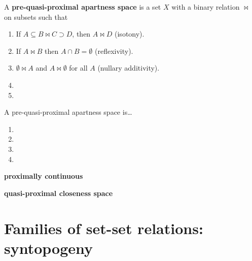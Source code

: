 \documentclass{article}
\def\Rp{[0,\infty]}
\begin{document}
\begin{defn}
  A \textbf{pre-quasi-proximal apartness space} is a set $X$ with a binary relation $\bowtie$ on subsets such that
  \begin{enumerate}
  \item If $A\subseteq B \bowtie C \supset D$, then $A\bowtie D$ (isotony).
  \item If $A\bowtie B$ then $A\cap B = \emptyset$ (reflexivity).
  \item $\emptyset \bowtie A$ and $A\bowtie \emptyset$ for all $A$ (nullary additivity).
  \item 
  \item 
  \end{enumerate}
  A pre-quasi-proximal apartness space is\dots
  \begin{enumerate}[resume]
  \item 
  \item 
  \item 
  \item 
  \end{enumerate}
  \textbf{proximally continuous}
\end{defn}

\begin{defn}
  \textbf{quasi-proximal closeness space}
\end{defn}


\section{Families of set-set relations: syntopogeny}
\label{sec:syntopogeny}









\end{document}
